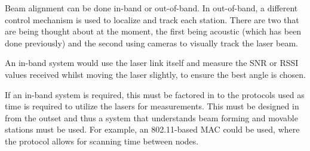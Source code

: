 Beam alignment can be done in-band or out-of-band. In out-of-band, a different
control mechanism is used to localize and track each station. There are two
that are being thought about at the moment, the first being acoustic (which
has been done previously) and the second using cameras to visually track the
laser beam.

An in-band system would use the laser link itself and measure the \ac{SNR} or
\ac{RSSI} values received whilst moving the laser slightly, to ensure the best
angle is chosen.

If an in-band system is required, this must be factored in to the protocols
used as time is required to utilize the lasers for measurements. This must
be designed in from the outset and thus a system that understands beam forming
and movable stations must be used. For example, an 802.11-based \ac{MAC} could
be used, where the protocol allows for scanning time between nodes.
